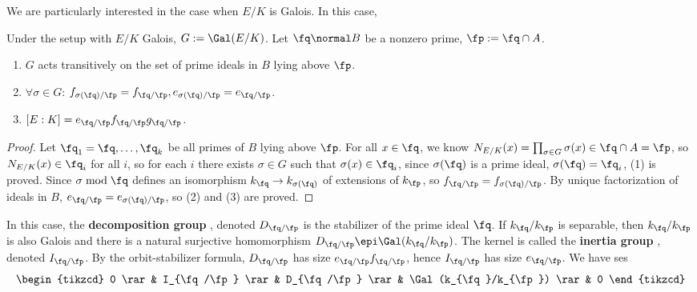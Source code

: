 \documentclass[11pt]{amsart}
\begin{document}
\medskip

We are particularly interested in the case when $E/K$ is Galois.  In this case,

\begin{prop}
    Under the setup with $E/K$ Galois, $G := \Gal(E/K)$.  Let $\fq \normal B$ be
    a nonzero prime, $\fp := \fq \cap A$.
    \begin{enumerate}
        \item $G$ acts transitively on the set of prime ideals in $B$ lying
            above $\fp$.
        \item $\forall \sigma \in G$: $f_{\sigma(\fq)/\fp} = f_{\fq/\fp},
            e_{\sigma(\fq)/\fp} = e_{\fq/\fp}$.
        \item $[E : K] = e_{\fq/\fp} f_{\fq/\fp} g_{\fq/\fp}$.
    \end{enumerate}
\end{prop}

\begin{proof}
    Let $\fq_1 = \fq, \ldots, \fq_k$ be all primes of $B$ lying above $\fp$.
    For all $x \in \fq$, we know $N_{E/K}(x) = \prod_{\sigma \in G} \sigma(x)
    \in \fq \cap A = \fp$, so $N_{E/K}(x) \in \fq_i$ for all $i$, so for each
    $i$ there exists $\sigma \in G$ such that $\sigma(x) \in \fq_i$, since
    $\sigma(\fq)$ is a prime ideal, $\sigma(\fq) = \fq_i$, (1) is proved.  Since
    $\sigma \bmod{\fq}$ defines an isomorphism $k_{\fq} \to k_{\sigma(\fq)}$ of
    extensions of $k_{\fp}$, so $f_{\fq/\fp} = f_{\sigma(\fq)/\fp}$.  By unique
    factorization of ideals in $B$, $e_{\fq/\fp} = e_{\sigma(\fq)/\fp}$, so (2)
    and (3) are proved.
\end{proof}

In this case, the {\bf decomposition group} , denoted
$D_{\fq/\fp}$ is the stabilizer of the prime ideal $\fq$.  If $k_{\fq}/k_{\fp}$
is separable, then $k_{\fq}/k_{\fp}$ is also Galois and there is a natural
surjective homomorphism $D_{\fq/\fp} \epi \Gal(k_{\fq}/k_{\fp})$.  The kernel is
called the {\bf inertia group} , denoted $I_{\fq/\fp}$.  By
the orbit-stabilizer formula, $D_{\fq/\fp}$ has size $e_{\fq/\fp} f_{\fq/\fp}$,
hence $I_{\fq/\fp}$ has size $e_{\fq/\fp}$.  We have ses
\[
  \begin{tikzcd}
    0 \rar & I_{\fq/\fp} \rar & D_{\fq/\fp} \rar & \Gal(k_{\fq}/k_{\fp}) \rar & 0
  \end{tikzcd}
\]

\medskip
\end{document}
